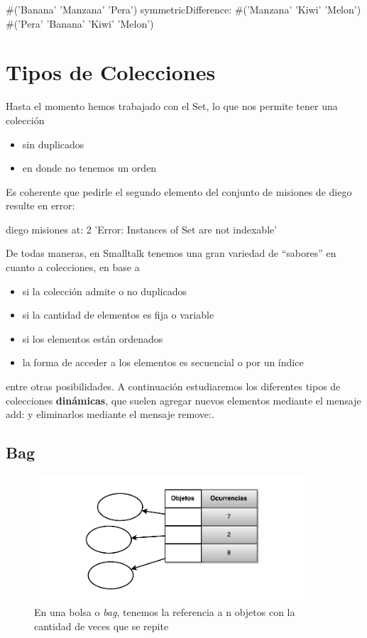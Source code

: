 \documentclass[a4paper,12pt]{book}
\begin{document}
\begin{code}
#('Banana' 'Manzana' 'Pera') 
      symmetricDifference: #('Manzana' 'Kiwi' 'Melon')
      #('Pera' 'Banana' 'Kiwi' 'Melon')
\end{code}

\section{Tipos de Colecciones}
Hasta el momento hemos trabajado con el Set, lo que nos permite tener una colección

\begin{itemize}
 \item sin duplicados
 \item en donde no tenemos un orden
\end{itemize}

Es coherente que pedirle el segundo elemento del conjunto de misiones de diego resulte en error:

\begin{code}
diego misiones at: 2
  'Error: Instances of Set are not indexable'
\end{code}

De todas maneras, en Smalltalk tenemos una gran variedad de ``sabores'' en cuanto a colecciones, en base a

\begin{itemize}
 \item si la colección admite o no duplicados
 \item si la cantidad de elementos es fija o variable
 \item si los elementos están ordenados
 \item la forma de acceder a los elementos es secuencial o por un índice
\end{itemize}

entre otras posibilidades. A continuación estudiaremos los diferentes tipos de colecciones \textbf{dinámicas}, que
suelen agregar nuevos elementos mediante el mensaje add: y eliminarlos mediante el mensaje remove:.

\subsection{Bag}

\begin{figure}[h!]
    \centering
    \includegraphics[width=0.9\textwidth]{images/40_Bag.pdf}
    \caption{En una bolsa o \textit{bag}, tenemos la referencia a n objetos con la cantidad de veces que se repite}
\end{figure}
\FloatBarrier
\end{document}

